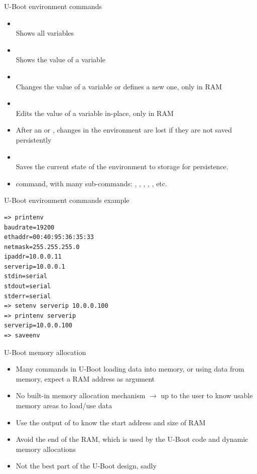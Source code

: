 \begin{frame}{U-Boot environment commands}
  \begin{itemize}
    \item {}\\
      Shows all variables
    \item {}\\
      Shows the value of a variable
    \item {}\\
      Changes the value of a variable or defines a new one, only in RAM
    \item {}\\
      Edits the value of a variable in-place, only in RAM
    \item After an  or , changes in the
      environment are lost if they are not saved persistently
    \item {}\\
      Saves the current state of the environment to storage for persistence.
    \item {} command, with many sub-commands: , , , ,
      , etc.
  \end{itemize}
\end{frame}

\begin{frame}[fragile]{U-Boot environment commands example}
  \begin{block}{}
\small
\begin{verbatim}
=> printenv
baudrate=19200
ethaddr=00:40:95:36:35:33
netmask=255.255.255.0
ipaddr=10.0.0.11
serverip=10.0.0.1
stdin=serial
stdout=serial
stderr=serial
=> setenv serverip 10.0.0.100
=> printenv serverip
serverip=10.0.0.100
=> saveenv
\end{verbatim}
\end{block}
\end{frame}

\begin{frame}{U-Boot memory allocation}
  \begin{itemize}
  \item Many commands in U-Boot loading data into memory, or using
    data from memory, expect a RAM address as argument
  \item No built-in memory allocation mechanism $\rightarrow$ up to
    the user to know usable memory areas to load/use data
  \item Use the output of  to know the start address and
    size of RAM
  \item Avoid the end of the RAM, which is used by the U-Boot code and
    dynamic memory allocations
  \item Not the best part of the U-Boot design, sadly
  \end{itemize}
\end{frame}

